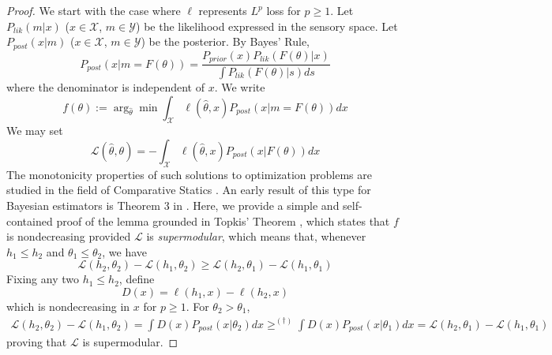 \begin{proof}
    We start with the case where $\ell$ represents $L^p$ loss for $p \geq 1$.
    Let $P_{lik}(m|x)$ ($x \in \mathcal{X}$, $m\in\mathcal{Y}$) be the likelihood expressed in the sensory space.
    Let $P_{post}(x|m)$ ($x \in \mathcal{X}$, $m\in\mathcal{Y}$) be the posterior.
    By Bayes' Rule,
    \begin{equation}
        P_{post}(x|m=F(\theta)) = \frac{P_{prior}(x) P_{lik}(F(\theta) | x)}{\int P_{lik}(F(\theta) | s) ds}
    \end{equation}
    where the denominator is independent of $x$.
We write
\begin{equation}
        f(\theta) := \arg_{\widehat{\theta}}\min \int_{\mathcal{X}} \ell(\widehat{\theta}, x) P_{post}(x|m=F(\theta)) dx 
    \end{equation}
    We may set
    \begin{equation}
        \mathcal{L}(\widehat{\theta}, \theta) = -\int_{\mathcal{X}} \ell(\widehat{\theta}, x) P_{post}(x|F(\theta)) dx
    \end{equation}
The monotonicity properties of such solutions to optimization problems are studied in the field of Comparative Statics \citep{topkis1998supermodularity}.
An early result of this type for Bayesian estimators is Theorem 3 in \citet{karlin1956theory}.
Here, we provide a simple and self-contained proof of the lemma grounded in Topkis' Theorem \citep{topkis1978minimizing, topkis1998supermodularity,milgrom1994monotone}, which states that $f$ is nondecreasing provided $\mathcal{L}$ is \emph{supermodular}, 
    which means that, whenever $h_1 \leq h_2$ and $\theta_1 \leq \theta_2$, we have
    \begin{equation}
    \mathcal{L}(h_2,\theta_2)-\mathcal{L}(h_1,\theta_2) \geq \mathcal{L}(h_2,\theta_1)-\mathcal{L}(h_1,\theta_1)
    \end{equation}
    Fixing any two $h_1 \leq h_2$, define
    \begin{equation}
        D(x) = \ell(h_1,x) - \ell(h_2,x)
    \end{equation}
    which is nondecreasing in $x$ for $p\geq 1$.
    For $\theta_2 > \theta_1$,
\begin{align*}
    \mathcal{L}(h_2,\theta_2) - \mathcal{L}(h_1,\theta_2) = \int D(x) P_{post}(x|\theta_2) dx 
     \geq^{(\dagger)}  \int D(x) P_{post}(x|\theta_1) dx 
     =  \mathcal{L}(h_2,\theta_1) - \mathcal{L}(h_1,\theta_1)
\end{align*}
proving that $\mathcal{L}$ is supermodular.

\end{proof}
